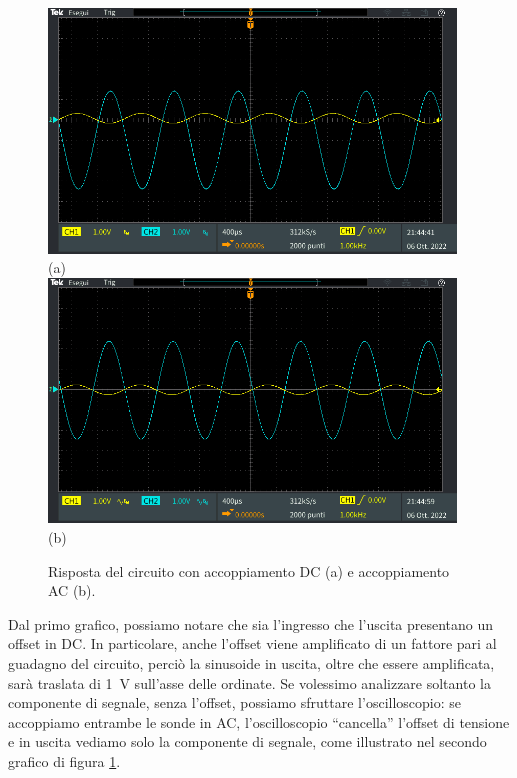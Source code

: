\documentclass{report}
\begin{document}
\begin{figure}
\centering
\includegraphics[height=6.5cm]{immagini/TEK00018}\\(a)\\[1ex]
\includegraphics[height=6.5cm]{immagini/TEK00019}\\(b)
\caption{Risposta del circuito con accoppiamento DC (a) e accoppiamento AC (b).}
	\label{figura:accopp}
\end{figure}
Dal primo grafico, possiamo notare che sia l'ingresso che l'uscita presentano un offset in DC. In particolare, anche l'offset viene amplificato di un fattore pari al guadagno del circuito, perciò la sinusoide in uscita, oltre che essere amplificata, sarà traslata di \SI{1}{\volt} sull'asse delle ordinate. Se volessimo analizzare soltanto la componente di segnale, senza l'offset, possiamo sfruttare l'oscilloscopio: se accoppiamo entrambe le sonde in AC, l'oscilloscopio ``cancella'' l'offset di tensione e in uscita vediamo solo la componente di segnale, come illustrato nel secondo grafico di figura \ref{figura:accopp}.

\end{document}
